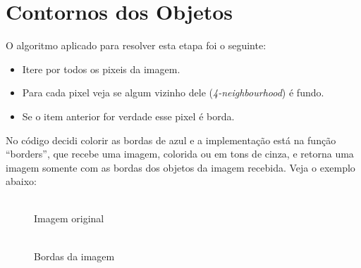 \documentclass[12pt, letterpaper]{article}
\begin{document}
\section{Contornos dos Objetos}
    O algoritmo aplicado para resolver esta etapa foi o seguinte:
    \begin{itemize}
        \item{Itere por todos os pixeis da imagem.}
        \item{Para cada pixel veja se algum vizinho dele (\textit{4-neighbourhood}) é fundo.}
        \item{Se o item anterior for verdade esse pixel é borda.}
    \end{itemize}
    
    No código decidi colorir as bordas de azul e a implementação está na função ``borders'', que recebe uma imagem, colorida ou em tons de cinza, e retorna uma imagem somente com as bordas dos objetos da imagem recebida. Veja o exemplo abaixo:

    \begin{figure}[H]
    \centering
    \begin{minipage}{.45\textwidth}
        \centering
        \\ {Imagem original}
    \end{minipage}
    \begin{minipage}{.45\textwidth}
        \centering
        \\ {Bordas da imagem}
    \end{minipage}
    \end{figure}
\end{document}
